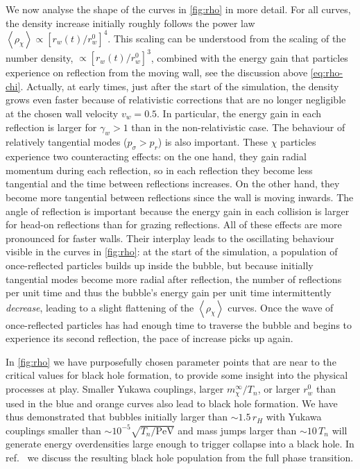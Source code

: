 \documentclass[
onecolumn, %
11pt, %
tightenlines,
superscriptaddress, %
nofootinbib, %
preprintnumbers, %
prd %
]{revtex4-1}
\newcommand{\ev}[1]{\ensuremath{\left\langle #1 %
        \right\rangle}} %
\begin{document}
We now analyse the shape of the curves in \cref{fig:rho} in more detail. For all curves, the density increase initially roughly follows the power law $\ev{\rho_\chi} \propto [r_w(t) / r_w^0]^4$. This scaling can be understood from the scaling of the number density, $\propto [r_w(t) / r_w^0]^3$, combined with the energy gain that particles experience on reflection from the moving wall, see the discussion above \cref{eq:rho-chi}. Actually, at early times, just after the start of the simulation, the density grows even faster because of relativistic corrections that are no longer negligible at the chosen wall velocity $v_w = 0.5$. In particular, the energy gain in each reflection is larger for $\gamma_w > 1$ than in the non-relativistic case. The behaviour of relatively tangential modes ($p_\sigma > p_r$) is also important. These $\chi$ particles experience two counteracting effects: on the one hand, they gain radial momentum during each reflection, so in each reflection they become less tangential and the time between reflections increases. On the other hand, they become more tangential between reflections since the wall is moving inwards. The angle of reflection is important because the energy gain in each collision is larger for head-on reflections than for grazing reflections.  All of these effects are more pronounced for faster walls. Their interplay leads to the oscillating behaviour visible in the curves in \cref{fig:rho}: at the start of the simulation, a population of once-reflected particles builds up inside the bubble, but because initially tangential modes become more radial after reflection, the number of reflections per unit time and thus the bubble's energy gain per unit time intermittently \emph{decrease}, leading to a slight flattening of the $\ev{\rho_\chi}$ curves. Once the wave of once-reflected particles has had enough time to traverse the bubble and begins to experience its second reflection, the pace of increase picks up again.

In \cref{fig:rho} we have purposefully chosen parameter points that are near to the critical values for black hole formation, to provide some insight into the physical processes at play. Smaller Yukawa couplings, larger $m_\chi^\infty/T_n$, or larger $r_w^0$ than used in the blue and orange curves also lead to black hole formation. We have thus demonstrated that bubbles initially larger than $\sim 1.5\,r_H$ with Yukawa couplings smaller than $\sim 10^{-5} \sqrt{T_n / \text{PeV}}$ and mass jumps larger than $\sim 10\,T_n$ will generate energy overdensities large enough to trigger collapse into a black hole.  In ref.~\cite{Baker:2021nyl} we discuss the resulting black hole population from the full phase transition.
\end{document}
